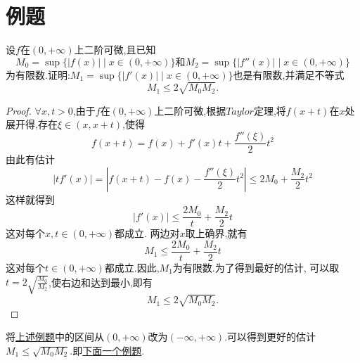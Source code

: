 \documentclass[lang=cn,newtx,10pt,scheme=chinese]{../Template/elegantbook}
\begin{document}
\section{例题}

\begin{example}\label{example:1.1(由原函数和二阶导数上确界估计一阶导数上确界)}
    设\(f\)在\((0,+\infty)\)上二阶可微,且已知
    \begin{equation}
    M_0=\sup\{\vert f(x)\vert\mid x\in(0,+\infty)\}\text{和}M_2=\sup\{\vert f''(x)\vert\mid x\in(0,+\infty)\}
        \nonumber
    \end{equation}
    为有限数.证明:\(M_1=\sup\{\vert f'(x)\vert\mid x\in(0,+\infty)\}\)也是有限数,并满足不等式
    \begin{equation}
        M_1\leq2\sqrt{M_0M_2}.
        \nonumber
    \end{equation}
        \begin{proof}
        $\forall x,t>0$,由于$f$在$(0,+\infty)$上二阶可微,根据$Taylor$定理,将$f(x+t)$在$x$处展开得,存在$\xi\in(x,x+t)$,使得
        \begin{equation}
    f(x+t)=f(x)+f'(x)t+\frac{f''(\xi)}{2}t^2
    \nonumber
        \end{equation}
        由此有估计
        \begin{equation}
        |tf'(x)|=|f(x+t)-f(x)-\frac{f''(\xi)}{2}t^2|\leqslant2M_0+\frac{M_2}{2}t^2
            \nonumber
        \end{equation}
        这样就得到
        \begin{equation}
    |f'(x)|\leqslant\frac{2M_0}{t}+\frac{M_2}{2}t
            \nonumber
        \end{equation}
        这对每个$x,t\in(0,+\infty)$都成立.
        两边对$x$取上确界,就有
        \begin{equation}
            M_1\leqslant\frac{2M_0}{t}+\frac{M_2}{2}t
            \nonumber
        \end{equation}
        这对每个$t\in(0,+\infty)$都成立.因此,$M_1$为有限数.为了得到最好的估计,
        可以取$t=2\sqrt{\frac{M_0}{M_2}}$,使右边和达到最小,即有
        \begin{equation}
            M_1\leqslant2\sqrt{M_0M_2}.
            \nonumber
        \end{equation}
        \end{proof}
\end{example}
\begin{remark}
    将\hyperref[example:1.1(由原函数和二阶导数上确界估计一阶导数上确界)]{上述例题}中的区间从$(0,+\infty)$改为$(-\infty,+\infty)$.可以得到更好的估计$M_1\leqslant \sqrt{M_0M_2}$.即\hyperref[example:1.1(由原函数和二阶导数上确界估计一阶导数上确界)(区间为R)]{下面一个例题}.
\end{remark}
\end{document}
